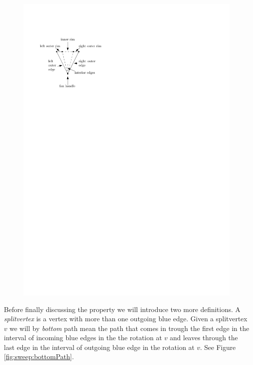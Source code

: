        \begin{figure}[h]
         \centering
         \includegraphics[scale=1]{rectangularDuals/img/fanterms}
         \caption{}
         \label{fig:rect:fanTerms}
       \end{figure}

    Before finally discussing the property we will introduce two more definitions.
    A \emph{splitvertex} is a vertex with more than one outgoing blue edge.
    Given a splitvertex $v$ we will by \emph{bottom} path mean the path that comes in trough the first edge in the interval of incoming blue edges in the the rotation at $v$ and leaves through the last edge in the interval of outgoing blue edge in the rotation at $v$.
    See Figure \ref{fig:sweep:bottomPath}.

